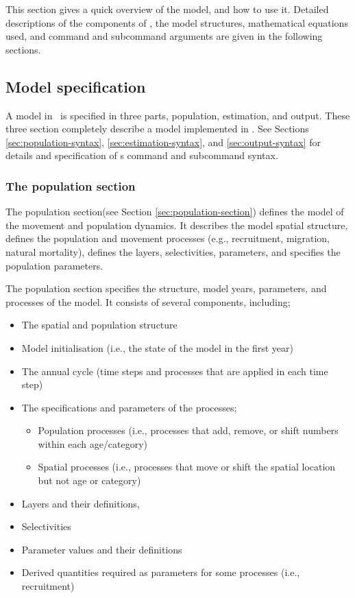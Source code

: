 This section gives a quick overview of the model, and how to use it. Detailed descriptions of the components of \SPM, the model structures, mathematical equations used, and command and subcommand arguments are given in the following sections.

\subsection{Model specification}

A model in \SPM\ is specified in three parts, population, estimation, and output. These three section completely describe a model implemented in \SPM. See Sections \ref{sec:population-syntax}, \ref{sec:estimation-syntax}, and \ref{sec:output-syntax} for details and specification of \SPM s command and subcommand syntax. 

\subsubsection{The population section}

The population section(see Section \ref{sec:population-section}) defines the model of the movement and population dynamics. It describes the model spatial structure, defines the population and movement processes (e.g., recruitment, migration, natural mortality), defines the layers, selectivities, parameters, and specifies the population parameters.

The population section specifies the structure, model years, parameters, and processes of the model. It consists of several components, including;
\begin{itemize}
  \item The spatial and population structure
  \item Model initialisation (i.e., the state of the model in the first year)
  \item The annual cycle (time steps and processes that are applied in each time step)
  \item The specifications and parameters of the processes;
  \begin{itemize}
    \item Population processes (i.e., processes that add, remove, or shift numbers within each age/category)
    \item Spatial processes (i.e., processes that move or shift the spatial location but not age or category)
  \end{itemize}
  \item Layers and their definitions,
  \item Selectivities
  \item Parameter values and their definitions
  \item Derived quantities required as parameters for some processes (i.e., recruitment)
\end{itemize}


